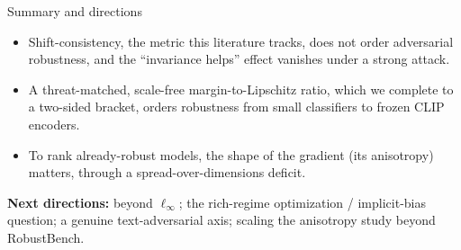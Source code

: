 \documentclass[aspectratio=169,10pt]{beamer}
\begin{document}
\begin{frame}{Summary and directions}{}
  \vspace{0.4em}
  \begin{itemize}\footnotesize\itemsep5pt
    \item Shift-consistency, the metric this literature tracks, does not order adversarial robustness, and
      the ``invariance helps'' effect vanishes under a strong attack.
    \item A threat-matched, scale-free margin-to-Lipschitz ratio, which we complete to a two-sided
      bracket, orders robustness from small classifiers to frozen CLIP encoders.
    \item To rank already-robust models, the shape of the gradient (its anisotropy) matters, through a
      spread-over-dimensions deficit.
  \end{itemize}
  \vspace{0.4em}
  {\footnotesize\color{slate}\textbf{Next directions:} beyond $\ell_\infty$; the rich-regime
  optimization / implicit-bias question; a genuine text-adversarial axis; scaling the anisotropy study
  beyond RobustBench.}
\end{frame}
\end{document}
